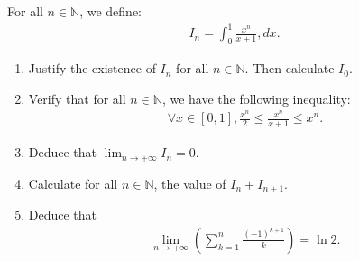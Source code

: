 \documentclass[12pt]{article}
\begin{document}
\newpage

\section{}
For all $n \in \mathbb{N}$, we define:
\begin{align*}
I_n = \int_0^1 \frac{x^n}{x+1} , dx.
\end{align*}
\begin{enumerate}
\item Justify the existence of $I_n$ for all $n \in \mathbb{N}$. Then calculate $I_0$.
\item Verify that for all $n \in \mathbb{N}$, we have the following inequality:
\begin{align*}
\forall x \in [0, 1], \frac{x^n}{2} \leq \frac{x^n}{x+1} \leq x^n.
\end{align*}
\item Deduce that $\lim_{n \to +\infty} I_n = 0$.
\item Calculate for all $n \in \mathbb{N}$, the value of $I_n + I_{n+1}$.
\item Deduce that
\begin{align*}
\lim_{n \to +\infty} \left( \sum_{k=1}^n \frac{(-1)^{k+1}}{k} \right) = \ln 2.
\end{align*}
\end{enumerate}

\newpage
\end{document}
